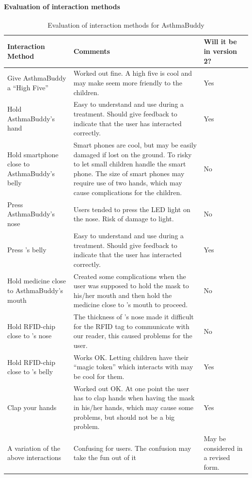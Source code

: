 \paragraph{Evaluation of interaction methods}
\label{chp:interaction-methods}
\begin{table}[H]
\begin{tabular}{|p{5.0cm} | p{6.0cm} | p{3.0cm} |}
\hline 
\textbf{Interaction Method} & \textbf{Comments} & \textbf{Will it be in version 2?}\\
\hline
	Give AsthmaBuddy a ``High Five'' & Worked out fine. A high five is cool and may make \ab{} seem more friendly to the children. & Yes \\
\hline
	Hold AsthmaBuddy's hand & Easy to understand and use during a treatment. Should give feedback to indicate that the user has interacted correctly. & Yes\\
\hline
	Hold smartphone close to AsthmaBuddy's belly & Smart phones are cool, but may be easily damaged if lost on the ground. To risky to let small children handle the smart phone. The size of smart phones may require use of two hands, which may cause complications for the children. & No \\
\hline
	Press AsthmaBuddy's nose & Users tended to press the LED light on the nose. Risk of damage to light. & No\\
\hline
	Press \buddy{}'s belly & Easy to understand and use during a treatment. Should give feedback to indicate that the user has interacted correctly. & Yes\\
\hline
	Hold medicine close to AsthmaBuddy's mouth & Created some complications when the user was supposed to hold the mask to his/her mouth and then hold the medicine close to \ab{}'s mouth to proceed. & No \\
\hline
	Hold RFID-chip close to \buddy{}'s nose & The thickness of \buddy{}'s nose made it difficult for the RFID tag to communicate with our reader, this caused problems for the user. & No \\
\hline
	Hold RFID-chip close to \buddy{}'s belly & Works OK. Letting children have their ``magic token'' which interacts with \ab{} may be cool for them. & Yes\\
\hline
	Clap your hands & Worked out OK. At one point the user has to clap hands when having the mask in his/her hands, which may cause some problems, but should not be a big problem. & Yes\\
\hline
	A variation of the above interactions & Confusing for users. The confusion may take the fun out of it & May be considered in a revised form.\\
\hline
\end{tabular}
\caption{Evaluation of interaction methods for AsthmaBuddy}
\label{tab:interactioneval}
\end{table}

